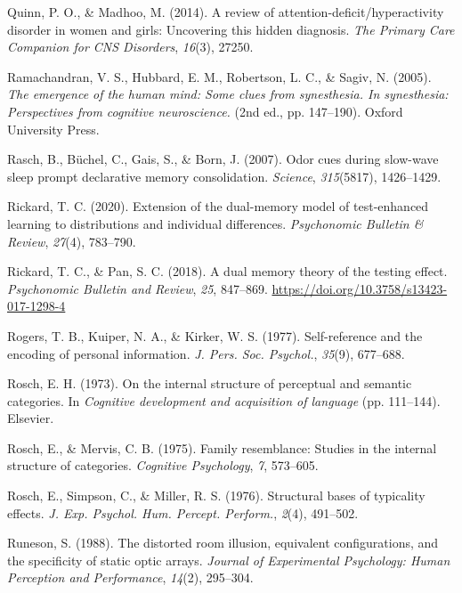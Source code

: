 \documentclass[
]{krantz}
\newlength{\cslhangindent}
\newlength{\cslentryspacingunit} %
\newenvironment{CSLReferences}[2] %
 {%
  \setlength{\parindent}{0pt}
  \ifodd #1
  \let\oldpar\par
  \def\par{\hangindent=\cslhangindent\oldpar}
  \fi
  \setlength{\parskip}{#2\cslentryspacingunit}
 }%
 {}
\begin{document}
\begin{CSLReferences}{1}{0}
\leavevmode{}%
Quinn, P. O., \& Madhoo, M. (2014). A review of attention-deficit/hyperactivity disorder in women and girls: Uncovering this hidden diagnosis. \emph{The Primary Care Companion for CNS Disorders}, \emph{16}(3), 27250.

\leavevmode{}%
Ramachandran, V. S., Hubbard, E. M., Robertson, L. C., \& Sagiv, N. (2005). \emph{The emergence of the human mind: Some clues from synesthesia. In synesthesia: Perspectives from cognitive neuroscience.} (2nd ed., pp. 147--190). Oxford University Press.

\leavevmode{}%
Rasch, B., Büchel, C., Gais, S., \& Born, J. (2007). Odor cues during slow-wave sleep prompt declarative memory consolidation. \emph{Science}, \emph{315}(5817), 1426--1429.

\leavevmode{}%
Rickard, T. C. (2020). Extension of the dual-memory model of test-enhanced learning to distributions and individual differences. \emph{Psychonomic Bulletin \& Review}, \emph{27}(4), 783--790.

\leavevmode{}%
Rickard, T. C., \& Pan, S. C. (2018). A dual memory theory of the testing effect. \emph{Psychonomic Bulletin and Review}, \emph{25}, 847--869. \url{https://doi.org/10.3758/s13423-017-1298-4}

\leavevmode{}%
Rogers, T. B., Kuiper, N. A., \& Kirker, W. S. (1977). Self-reference and the encoding of personal information. \emph{J. Pers. Soc. Psychol.}, \emph{35}(9), 677--688.

\leavevmode{}%
Rosch, E. H. (1973). On the internal structure of perceptual and semantic categories. In \emph{Cognitive development and acquisition of language} (pp. 111--144). Elsevier.

\leavevmode{}%
Rosch, E., \& Mervis, C. B. (1975). Family resemblance: Studies in the internal structure of categories. \emph{Cognitive Psychology}, \emph{7}, 573--605.

\leavevmode{}%
Rosch, E., Simpson, C., \& Miller, R. S. (1976). Structural bases of typicality effects. \emph{J. Exp. Psychol. Hum. Percept. Perform.}, \emph{2}(4), 491--502.

\leavevmode{}%
Runeson, S. (1988). The distorted room illusion, equivalent configurations, and the specificity of static optic arrays. \emph{Journal of Experimental Psychology: Human Perception and Performance}, \emph{14}(2), 295--304.


\end{CSLReferences}
\end{document}
